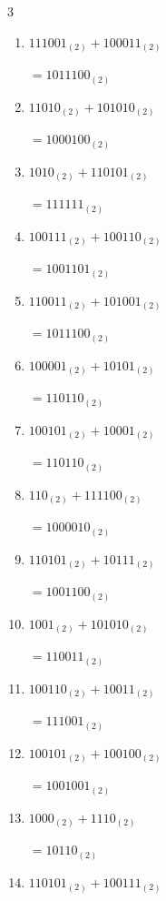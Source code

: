 \begin{multicols}{3}
\begin{enumerate}
        $=11101_{(2)}$

  \item $111001_{(2)} + 100011_{(2)}$

        $=1011100_{(2)}$

  \item $11010_{(2)} + 101010_{(2)}$

        $=1000100_{(2)}$

  \item $1010_{(2)} + 110101_{(2)}$

        $=111111_{(2)}$

  \item $100111_{(2)} + 100110_{(2)}$

        $=1001101_{(2)}$

  \item $110011_{(2)} + 101001_{(2)}$

        $=1011100_{(2)}$

  \item $100001_{(2)} + 10101_{(2)}$

        $=110110_{(2)}$

\columnbreak %

\resetques

  \item $100101_{(2)} + 10001_{(2)}$

        $=110110_{(2)}$

  \item $110_{(2)} + 111100_{(2)}$

        $=1000010_{(2)}$

  \item $110101_{(2)} + 10111_{(2)}$

        $=1001100_{(2)}$

  \item $1001_{(2)} + 101010_{(2)}$

        $=110011_{(2)}$

  \item $100110_{(2)} + 10011_{(2)}$

        $=111001_{(2)}$

  \item $100101_{(2)} + 100100_{(2)}$

        $=1001001_{(2)}$

  \item $1000_{(2)} + 1110_{(2)}$

        $=10110_{(2)}$

  \item $110101_{(2)} + 100111_{(2)}$


\end{enumerate}
\end{multicols}
